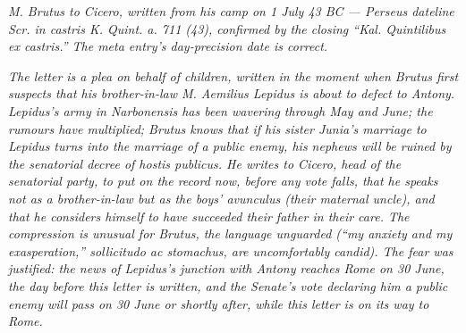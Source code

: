 
\textit{M. Brutus to Cicero, written from his camp on
1 July 43 BC --- Perseus dateline \textit{Scr. in castris
K. Quint. a. 711 (43)}, confirmed by the closing
``\textit{Kal. Quintilibus ex castris}.'' The meta entry's
day-precision date is correct.}

\textit{The letter is a plea on behalf of children, written
in the moment when Brutus first suspects that his
brother-in-law M. Aemilius Lepidus is about to defect to
Antony. Lepidus's army in Narbonensis has been wavering
through May and June; the rumours have multiplied; Brutus
knows that if his sister Junia's marriage to Lepidus turns
into the marriage of a public enemy, his nephews will be
ruined by the senatorial decree of \textit{hostis
publicus}. He writes to Cicero, head of the senatorial
party, to put on the record now, before any vote falls,
that he speaks not as a brother-in-law but as the boys'
\textit{avunculus} (their maternal uncle), and that he
considers himself to have succeeded their father in
their care. The compression is unusual for Brutus, the
language unguarded (``my anxiety and my exasperation,''
\textit{sollicitudo ac stomachus}, are uncomfortably
candid). The fear was justified: the news of Lepidus's
junction with Antony reaches Rome on 30 June, the day
before this letter is written, and the Senate's vote
declaring him a public enemy will pass on 30 June or
shortly after, while this letter is on its way to Rome.}
